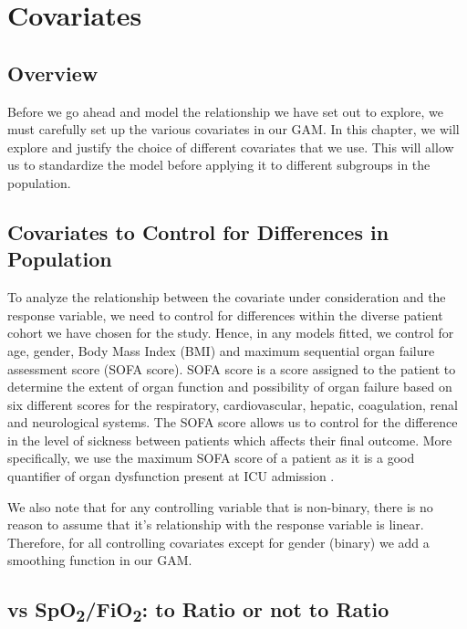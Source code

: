 
\chapter{Covariates} %

\label{ChapterX} %
\section{Overview}

Before we go ahead and model the relationship we have set out to explore, we must carefully set up the various covariates in our GAM. In this chapter, we will explore and justify the choice of different covariates that we use. This will allow us to standardize the model before applying it to different subgroups in the population.

\section{Covariates to Control for Differences in Population}

To analyze the relationship between the covariate under consideration and the response variable, we need to control for differences within the diverse patient cohort we have chosen for the study. Hence, in any models fitted, we control for age, gender, Body Mass Index (BMI) and maximum sequential organ failure assessment score (SOFA score). SOFA score is a score assigned to the patient to determine the extent of organ function and possibility of organ failure based on six different scores for the respiratory, cardiovascular, hepatic, coagulation, renal and neurological systems. The SOFA score allows us to control for the difference in the level of sickness between patients which affects their final outcome. More specifically, we use the maximum SOFA score of a patient as it is a good quantifier of organ dysfunction present at ICU admission \citep{moreno1999use}. 

We also note that for any controlling variable that is non-binary, there is no reason to assume that it's relationship with the response variable is linear. Therefore, for all controlling covariates except for gender (binary) we add a smoothing function in our GAM.

\section{\Sp vs SpO\textsubscript{2}/FiO\textsubscript{2}: to Ratio or not to Ratio}

